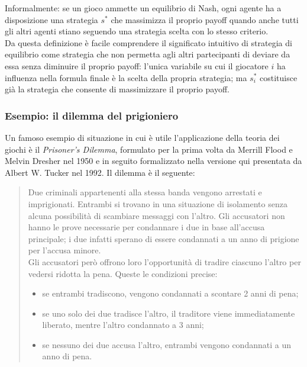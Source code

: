 \noindent
Informalmente: se un gioco ammette un equilibrio di Nash, ogni agente ha a disposizione una strategia $s^*$ che massimizza il proprio payoff quando anche tutti gli altri agenti stiano seguendo una strategia scelta con lo stesso criterio.\\
Da questa definizione è facile comprendere il significato intuitivo di strategia di equilibrio come strategia che non permetta agli altri partecipanti di deviare da essa senza diminuire il proprio payoff: l'unica variabile su cui il giocatore $i$ ha influenza nella formula finale è la scelta della propria strategia; ma $s_i^*$ costituisce già la strategia che consente di massimizzare il proprio payoff.


\subsubsection*{Esempio: il dilemma del prigioniero}

Un famoso esempio di situazione in cui è utile l'applicazione della teoria dei giochi è il \emph{Prisoner's Dilemma}, formulato per la prima volta da Merrill Flood e Melvin Dresher nel 1950 e in seguito formalizzato nella versione qui presentata da Albert W. Tucker nel 1992.
Il dilemma è il seguente:

\begin{quote}
   Due criminali appartenenti alla stessa banda vengono arrestati e imprigionati. Entrambi si trovano in una situazione di isolamento senza alcuna possibilità di scambiare messaggi con l'altro. Gli accusatori non hanno le prove necessarie per condannare i due in base all'accusa principale; i due infatti sperano di essere condannati a un anno di prigione per l'accusa minore.\\
   Gli accusatori però offrono loro l'opportunità di tradire ciascuno l'altro per vedersi ridotta la pena.
   Queste le condizioni precise:
   \begin{itemize}
      \item se entrambi tradiscono, vengono condannati a scontare 2 anni di pena;
      \item se uno solo dei due tradisce l'altro, il traditore viene immediatamente liberato, mentre l'altro condannato a 3 anni;
      \item se nessuno dei due accusa l'altro, entrambi vengono condannati a un anno di pena.
   \end{itemize}
   
\end{quote}



